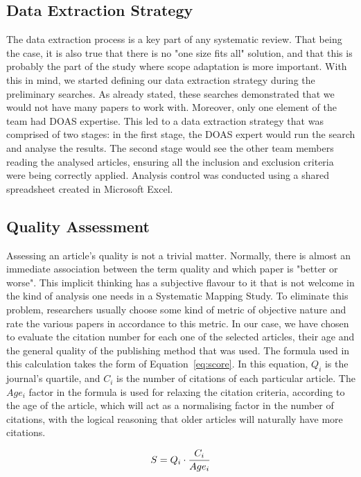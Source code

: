 \subsection{Data Extraction Strategy}
\label{sub:data_extraction_strategy}

The data extraction process is a key part of any systematic review. That
being the case, it is also true that there is no "one size fits all"
solution, and that this is probably the part of the study where scope
adaptation is more important. With this in mind, we started defining our
data extraction strategy during the preliminary searches. As already
stated, these searches demonstrated that we would not have many papers
to work with. Moreover, only one element of the team had DOAS expertise.
This led to a data extraction strategy that was comprised of two stages:
in the first stage, the DOAS expert would run the search and analyse
the results. The second stage would see the other team members reading
the analysed articles, ensuring all the inclusion and exclusion criteria
were being correctly applied. Analysis control was conducted using a
shared spreadsheet created in Microsoft Excel.

\subsection{Quality Assessment}
\label{sub:quality_assessment}

Assessing an article's quality is not a trivial matter. Normally, there
is almost an immediate association between the term quality and which
paper is "better or worse". This implicit thinking has a subjective
flavour to it that is not welcome in the kind of analysis one needs in a
Systematic Mapping Study. To eliminate this problem, researchers usually
choose some kind of metric of objective nature and rate the various
papers in accordance to this metric. In our case, we have chosen to
evaluate the citation number for each one of the selected articles,
their age and the general quality of the publishing method that was
used. The formula used in this calculation takes the form of
Equation~\ref{eq:score}. In this equation, $Q_{i}$ is the journal's
quartile, and $C_{i}$ is the number of citations of each particular
article. The $Age_i$ factor in the formula is used for relaxing the
citation criteria, according to the age of the article, which will act
as a normalising factor in the number of citations, with the logical
reasoning that older articles will naturally have more citations.

\begin{equation}
    \centering
    \label{eq:score}
    S = Q_{i} \cdot \frac{C_{i}}{Age_{i}}
\end{equation}
